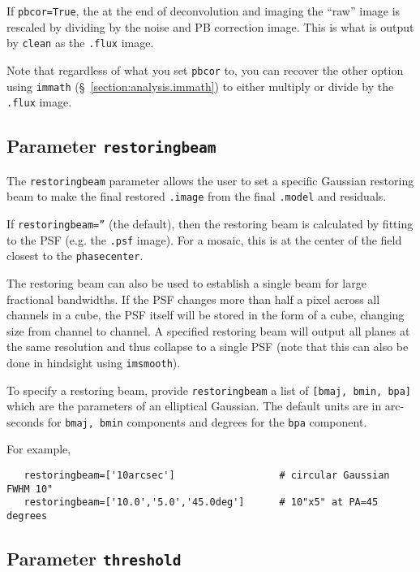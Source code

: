 If {\tt pbcor=True}, the at the end of deconvolution and imaging the
``raw'' image is rescaled by dividing by the noise and PB correction
image.  This is what is output by {\tt clean} as the {\tt .flux}
image.  

Note that regardless of what you set {\tt pbcor} to, you can recover
the other option using {\tt immath} (\S~\ref{section:analysis.immath})
to either multiply or divide by the {\tt .flux} image.

\subsection{Parameter {\tt restoringbeam} }
\label{section:im.clean.restoringbeam}

The {\tt restoringbeam} parameter allows the user to set a specific
Gaussian restoring beam to make the final restored {\tt .image} from
the final {\tt .model} and residuals.

If {\tt restoringbeam=''} (the default), then the restoring beam
is calculated by fitting to the PSF (e.g. the {\tt .psf} image).
For a mosaic, this is at the center of the field closest to the
{\tt phasecenter}.

The restoring beam can also be used to establish a single beam for
large fractional bandwidths. If the PSF changes more than half a pixel
across all channels in a cube, the PSF itself will be stored in the
form of a cube, changing size from channel to channel. A specified
restoring beam will output all planes at the same resolution and thus
collapse to a single PSF (note that this can also be done in hindsight
using {\tt imsmooth}).

To specify a restoring beam, provide {\tt restoringbeam} a list of 
{\tt [bmaj, bmin, bpa]} which are the parameters of an elliptical
Gaussian.  The default units are in arc-seconds for {\tt bmaj, bmin}
components and degrees for the {\tt bpa} component.

For example,
\small
\begin{verbatim}
   restoringbeam=['10arcsec']                  # circular Gaussian FWHM 10"
   restoringbeam=['10.0','5.0','45.0deg']      # 10"x5" at PA=45 degrees
\end{verbatim}
\normalsize

\subsection{Parameter {\tt threshold} }
\label{section:im.clean.thresh}

